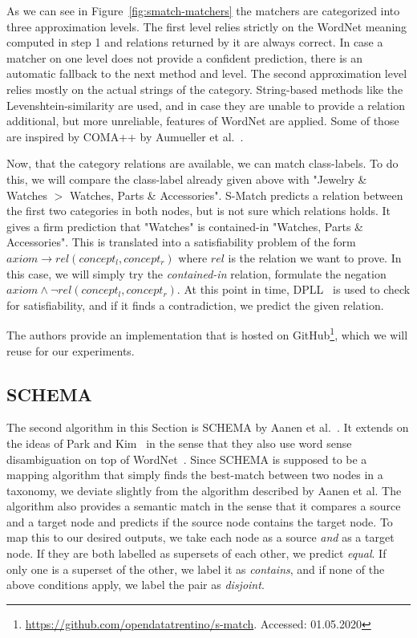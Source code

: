 As we can see in Figure~\ref{fig:smatch-matchers} the matchers are categorized into three approximation levels.
The first level relies strictly on the WordNet meaning computed in step 1 and relations returned by it are always correct.
In case a matcher on one level does not provide a confident prediction, there is an automatic fallback to the next method and level.
The second approximation level relies mostly on the actual strings of the category.
String-based methods like the Levenshtein-similarity are used, and in case they are unable to provide a relation
additional, but more unreliable, features of WordNet are applied.
Some of those are inspired by COMA++ by Aumueller et al.\@~\cite{aumueller2005schema}.

Now, that the category relations are available, we can match class-labels.
To do this, we will compare the class-label already given above with "Jewelry \& Watches $>$ Watches, Parts \& Accessories".
S-Match predicts a relation between the first two categories in both nodes, but is not sure which relations holds.
It gives a firm prediction that "Watches" is contained-in "Watches, Parts \& Accessories".
This is translated into a satisfiability problem of the form $axiom \rightarrow rel(concept_l, concept_r)$
where $rel$ is the relation we want to prove.
In this case, we will simply try the \emph{contained-in} relation, formulate the negation $axiom \wedge \lnot rel(concept_l, concept_r)$.
At this point in time, DPLL~\cite{davis1962machine} is used to check for satisfiability, and if it finds a contradiction,
we predict the given relation.

The authors provide an implementation that is hosted on GitHub\footnote{\url{https://github.com/opendatatrentino/s-match}. Accessed: 01.05.2020},
which we will reuse for our experiments.

\subsection{SCHEMA}
\label{subsec:schema}

The second algorithm in this Section is SCHEMA by Aanen et al.\@~\cite{aanen2012schema}.
It extends on the ideas of Park and Kim~\cite{park2007ontology} in the sense that they also use
word sense disambiguation on top of WordNet~\cite{miller1995wordnet}.
Since SCHEMA is supposed to be a mapping algorithm that simply finds the best-match between two nodes
in a taxonomy, we deviate slightly from the algorithm described by Aanen et al.
The algorithm also provides a semantic match in the sense that it compares a source and a target node
and predicts if the source node contains the target node.
To map this to our desired outputs, we take each node as a source \emph{and} as a target node.
If they are both labelled as supersets of each other, we predict \emph{equal}.
If only one is a superset of the other,
we label it as \emph{contains}, and if none of the above conditions apply, we label the pair as \emph{disjoint}.

